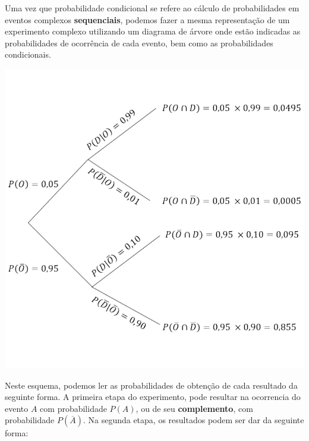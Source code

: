 \documentclass[
]{book}
\begin{document}
Uma vez que probabilidade condicional se refere ao cálculo de probabilidades em eventos complexos \textbf{sequenciais}, podemos fazer a mesma representação de um experimento complexo utilizando um diagrama de árvore onde estão indicadas as probabilidades de ocorrência de cada evento, bem como as probabilidades condicionais.

\begin{center}\includegraphics{probest-cambientais_files/figure-latex/unnamed-chunk-192-1} \end{center}

Neste esquema, podemos ler as probabilidades de obtenção de cada resultado da seguinte forma. A primeira etapa do experimento, pode resultar na ocorrencia do evento \(A\) com probabilidade \(P(A)\), ou de seu \textbf{complemento}, com probabilidade \(P(\overline{A})\). Na segunda etapa, os resultados podem ser dar da seguinte forma:
\end{document}
